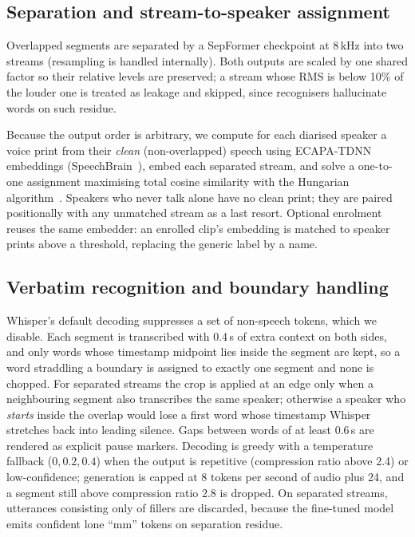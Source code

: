 \documentclass[conference]{IEEEtran}
\begin{document}
\subsection{Separation and stream-to-speaker assignment}
Overlapped segments are separated by a SepFormer checkpoint at 8\,kHz into two streams (resampling is handled internally). Both outputs are scaled by one shared factor so their relative levels are preserved; a stream whose RMS is below 10\% of the louder one is treated as leakage and skipped, since recognisers hallucinate words on such residue.

Because the output order is arbitrary, we compute for each diarised speaker a voice print from their \emph{clean} (non-overlapped) speech using ECAPA-TDNN~\cite{desplanques2020ecapa} embeddings (SpeechBrain~\cite{ravanelli2021speechbrain}), embed each separated stream, and solve a one-to-one assignment maximising total cosine similarity with the Hungarian algorithm~\cite{kuhn1955hungarian}. Speakers who never talk alone have no clean print; they are paired positionally with any unmatched stream as a last resort. Optional enrolment reuses the same embedder: an enrolled clip's embedding is matched to speaker prints above a threshold, replacing the generic label by a name.

\subsection{Verbatim recognition and boundary handling}
Whisper's default decoding suppresses a set of non-speech tokens, which we disable. Each segment is transcribed with 0.4\,s of extra context on both sides, and only words whose timestamp midpoint lies inside the segment are kept, so a word straddling a boundary is assigned to exactly one segment and none is chopped. For separated streams the crop is applied at an edge only when a neighbouring segment also transcribes the same speaker; otherwise a speaker who \emph{starts} inside the overlap would lose a first word whose timestamp Whisper stretches back into leading silence. Gaps between words of at least 0.6\,s are rendered as explicit pause markers. Decoding is greedy with a temperature fallback ($0, 0.2, 0.4$) when the output is repetitive (compression ratio above 2.4) or low-confidence; generation is capped at 8 tokens per second of audio plus 24, and a segment still above compression ratio 2.8 is dropped. On separated streams, utterances consisting only of fillers are discarded, because the fine-tuned model emits confident lone ``mm'' tokens on separation residue.
\end{document}
